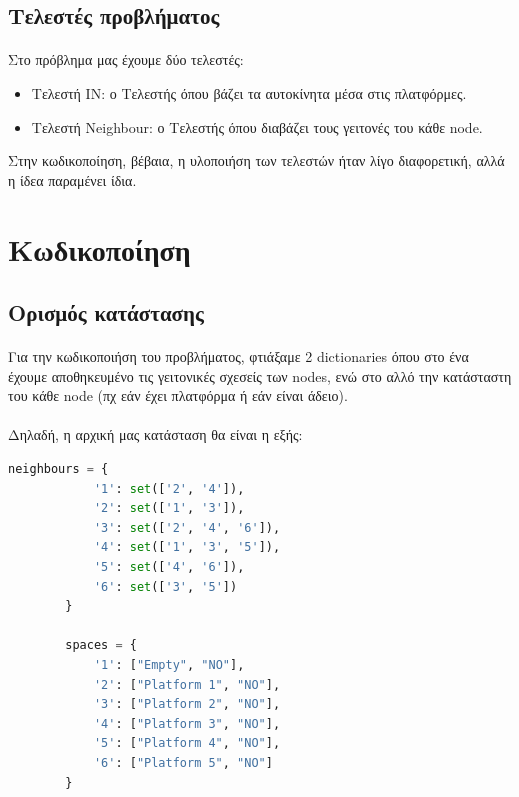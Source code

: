 \documentclass{article}
\begin{document}
    \subsection{Τελεστές προβλήματος}
    \paragraph{}
    Στο πρόβλημα μας έχουμε δύο τελεστές:

    \begin{itemize}
        \item Τελεστή IN: ο Τελεστής όπου βάζει τα αυτοκίνητα μέσα στις πλατφόρμες.
        \item Tελεστή Neighbour: ο Τελεστής όπου διαβάζει τους γειτονές του κάθε node.
    \end{itemize}

    Στην κωδικοποίηση, βέβαια, η υλοποιήση των τελεστών ήταν λίγο διαφορετική, αλλά η ίδεα παραμένει ίδια.

    \newpage
    \section{Κωδικοποίηση}
    \subsection{Ορισμός κατάστασης}
    \paragraph{}
    Για την κωδικοποιήση του προβλήματος, φτιάξαμε 2 dictionaries όπου στο ένα έχουμε αποθηκευμένο τις γειτονικές σχεσείς των nodes, ενώ στο αλλό την κατάσταστη του κάθε
    node (πχ εάν έχει πλατφόρμα ή εάν είναι άδειο).

    \paragraph{}
    Δηλαδή, η αρχική μας κατάσταση θα είναι η εξής:

    \begin{lstlisting}[language=Python]
        neighbours = {
            '1': set(['2', '4']),
            '2': set(['1', '3']),
            '3': set(['2', '4', '6']),
            '4': set(['1', '3', '5']),
            '5': set(['4', '6']),
            '6': set(['3', '5'])
        }

        spaces = {
            '1': ["Empty", "NO"],
            '2': ["Platform 1", "NO"],
            '3': ["Platform 2", "NO"],
            '4': ["Platform 3", "NO"],
            '5': ["Platform 4", "NO"],
            '6': ["Platform 5", "NO"]
        }
    \end{lstlisting}
\end{document}
